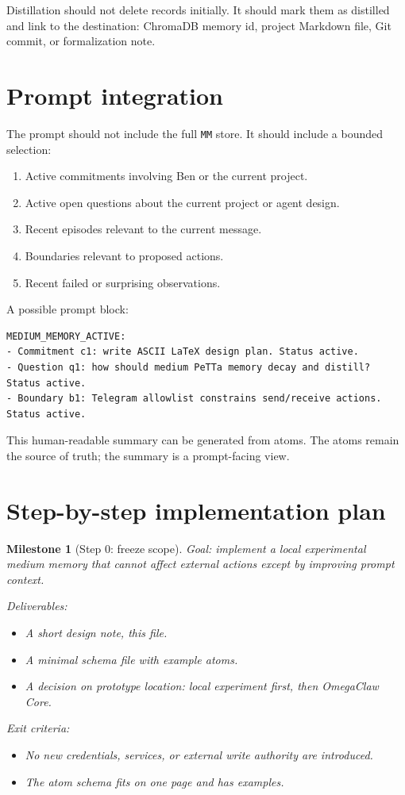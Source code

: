 \documentclass[11pt]{article}
\newtheorem{milestone}{Milestone}
\begin{document}
Distillation should not delete records initially.  It should mark them as distilled
and link to the destination: ChromaDB memory id, project Markdown file, Git commit,
or formalization note.

\section{Prompt integration}

The prompt should not include the full \texttt{MM} store.  It should include a bounded
selection:
\begin{enumerate}
  \item Active commitments involving Ben or the current project.
  \item Active open questions about the current project or agent design.
  \item Recent episodes relevant to the current message.
  \item Boundaries relevant to proposed actions.
  \item Recent failed or surprising observations.
\end{enumerate}

A possible prompt block:
\begin{verbatim}
MEDIUM_MEMORY_ACTIVE:
- Commitment c1: write ASCII LaTeX design plan. Status active.
- Question q1: how should medium PeTTa memory decay and distill? Status active.
- Boundary b1: Telegram allowlist constrains send/receive actions. Status active.
\end{verbatim}

This human-readable summary can be generated from atoms.  The atoms remain the source
of truth; the summary is a prompt-facing view.

\section{Step-by-step implementation plan}

\begin{milestone}[Step 0: freeze scope]
Goal: implement a local experimental medium memory that cannot affect external actions
except by improving prompt context.

Deliverables:
\begin{itemize}
  \item A short design note, this file.
  \item A minimal schema file with example atoms.
  \item A decision on prototype location: local experiment first, then OmegaClaw Core.
\end{itemize}

Exit criteria:
\begin{itemize}
  \item No new credentials, services, or external write authority are introduced.
  \item The atom schema fits on one page and has examples.
\end{itemize}
\end{milestone}
\end{document}
